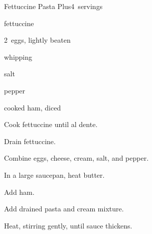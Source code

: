 \begin{recipe}{Fettuccine Pasta Plus}{}{4~servings}

\begin{ingredients}
\item {} fettuccine
\item 2~eggs, lightly beaten
\item \C{\twothird} 
\item {} whipping 
\item salt
\item pepper
\item {}
\item {} cooked ham, diced
\end{ingredients}

\begin{directions}
\item Cook fettuccine until al dente.
\item Drain fettuccine.
\item Combine eggs, cheese, cream, salt, and pepper.
\item In a large saucepan, heat butter.
\item Add ham.
\item Add drained pasta and cream mixture.
\item Heat, stirring gently, until sauce thickens.
\end{directions}

\end{recipe}
